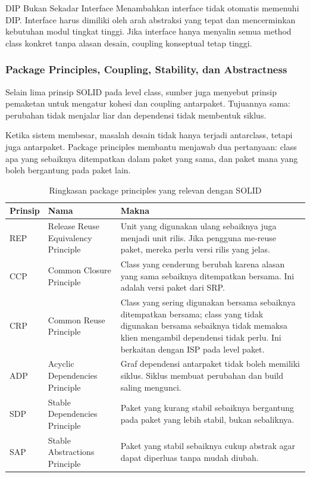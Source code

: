 \begin{cmt}{DIP Bukan Sekadar Interface}{}
Menambahkan interface tidak otomatis memenuhi DIP. Interface harus dimiliki oleh arah abstraksi yang tepat dan mencerminkan kebutuhan modul tingkat tinggi. Jika interface hanya menyalin semua method class konkret tanpa alasan desain, coupling konseptual tetap tinggi.
\end{cmt}

\subsubsection{Package Principles, Coupling, Stability, dan Abstractness}

\begin{jawab}
Selain lima prinsip SOLID pada level class, sumber juga menyebut prinsip pemaketan untuk mengatur kohesi dan coupling antarpaket. Tujuannya sama: perubahan tidak menjalar liar dan dependensi tidak membentuk siklus.
\end{jawab}

Ketika sistem membesar, masalah desain tidak hanya terjadi antarclass, tetapi juga antarpaket. Package principles membantu menjawab dua pertanyaan: class apa yang sebaiknya ditempatkan dalam paket yang sama, dan paket mana yang boleh bergantung pada paket lain.

\begin{table}[H]
\centering
\begin{tabularx}{\textwidth}{|L{0.18\textwidth}|L{0.28\textwidth}|X|}
\hline
\textbf{Prinsip} & \textbf{Nama} & \textbf{Makna} \\
\hline
REP & Release Reuse Equivalency Principle & Unit yang digunakan ulang sebaiknya juga menjadi unit rilis. Jika pengguna me-reuse paket, mereka perlu versi rilis yang jelas. \\
\hline
CCP & Common Closure Principle & Class yang cenderung berubah karena alasan yang sama sebaiknya ditempatkan bersama. Ini adalah versi paket dari SRP. \\
\hline
CRP & Common Reuse Principle & Class yang sering digunakan bersama sebaiknya ditempatkan bersama; class yang tidak digunakan bersama sebaiknya tidak memaksa klien mengambil dependensi tidak perlu. Ini berkaitan dengan ISP pada level paket. \\
\hline
ADP & Acyclic Dependencies Principle & Graf dependensi antarpaket tidak boleh memiliki siklus. Siklus membuat perubahan dan build saling mengunci. \\
\hline
SDP & Stable Dependencies Principle & Paket yang kurang stabil sebaiknya bergantung pada paket yang lebih stabil, bukan sebaliknya. \\
\hline
SAP & Stable Abstractions Principle & Paket yang stabil sebaiknya cukup abstrak agar dapat diperluas tanpa mudah diubah. \\
\hline
\end{tabularx}
\caption{Ringkasan package principles yang relevan dengan SOLID}
\label{tab:package-principles-solid}
\end{table}

